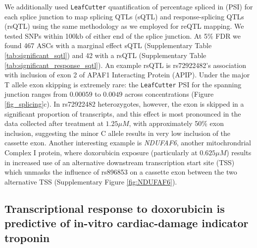 \documentclass{article}
\begin{document}
We additionally used \texttt{LeafCutter} quantification of percentage spliced in (PSI) for each splice junction to map splicing QTLs (sQTL) and response-splicing QTLs (rsQTL) using the same methodology as we employed for reQTL mapping. We tested SNPs within 100kb of either end of the splice junction. At 5\% FDR we found 467 ASCs with a marginal effect sQTL (Supplementary Table \ref{tab:significant_sqtl}) and 42 with a rsQTL (Supplementary Table \ref{tab:significant_response_sqtl}). An example rsQTL is rs72922482's association with inclusion of exon 2 of APAF1 Interacting Protein (APIP). Under the major T allele exon skipping is extremely rare: the \texttt{LeafCutter} PSI for the spanning junction ranges from $0.00059$ to $0.0049$ across concentrations (Figure \ref{fig_splicing}c). In rs72922482 heterozygotes, however, the exon is skipped in a significant proportion of transcripts, and this effect is most pronounced in the data collected after treatment at $1.25 \mu M$, with approximately 50\% exon inclusion, suggesting the minor C allele results in very low inclusion of the cassette exon. Another interesting example is \emph{NDUFAF6}, another mitochrondrial Complex I protein, where doxorubicin exposure (particularly at $0.625 \mu M$) results in increased use of an alternative downstream transcription start site (TSS) which unmasks the influence of rs896853 on a cassette exon between the two alternative TSS (Supplementary Figure \ref{fig:NDUFAF6}).

\subsection*{Transcriptional response to doxorubicin is predictive of in-vitro cardiac-damage indicator troponin}
\end{document}
